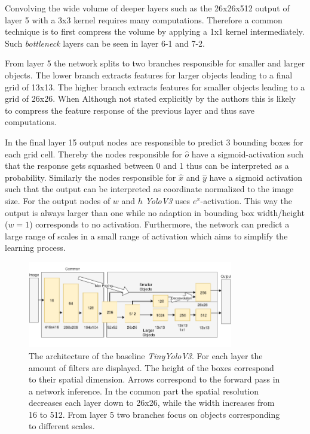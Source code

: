 	Convolving the wide volume of deeper layers such as the 26x26x512  output of layer 5 with a 3x3 kernel requires many computations. Therefore a common technique is to first compress the volume by applying a 1x1 kernel intermediately. Such \textit{bottleneck} layers can be seen in layer 6-1 and 7-2.
	
	From layer 5 the network splits to two branches responsible for smaller and larger objects. The lower branch extracts features for larger objects leading to a final grid of 13x13. The higher branch extracts features for smaller objects leading to a grid of 26x26. When Although not stated explicitly by the authors this is likely to compress the feature response of the previous layer and thus save computations.
	
	In the final layer 15 output nodes are responsible to predict 3 bounding boxes for each grid cell. Thereby the nodes responsible for $\hat o$ have a sigmoid-activation such that the response gets squashed between 0 and 1 thus can be interpreted as a probability. Similarly the nodes responsible for $\hat x$ and $\hat y$ have a sigmoid activation such that the output can be interpreted as coordinate normalized to the image size. For the output nodes of $w$ and $h$ \textit{YoloV3} uses $e^x$-activation. This way the output is always larger than one while no adaption in bounding box width/height ($w=1$) corresponds to no activation. Furthermore, the network can predict a large range of scales in a small range of activation which aims to simplify the learning process.
	
			
	\begin{figure}[hbtp]
		\centering
		\includegraphics[width=0.8\textwidth]{fig/tinyyolov3_arch}
		\caption{The architecture of the baseline \textit{TinyYoloV3}. For each layer the amount of filters are displayed. The height of the boxes correspond to their spatial dimension. Arrows correspond to the forward pass in a network inference. In the common part the spatial resolution decreases each layer down to 26x26, while the width increases from 16 to 512. From layer 5 two branches focus on objects corresponding to different scales. }
		\label{fig:tinyyolov3_arch}
	\end{figure}
	

